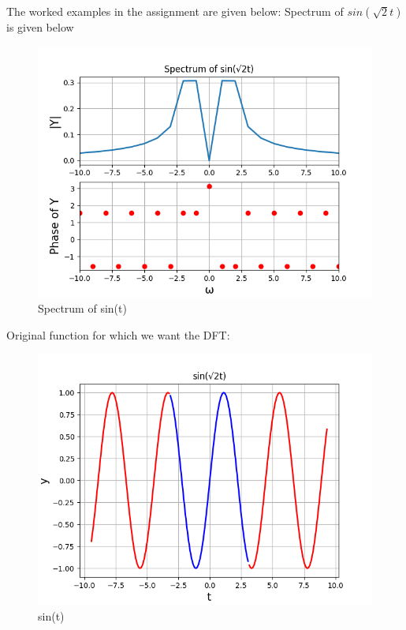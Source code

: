 \documentclass{article}
\begin{document}
The worked examples in the assignment are given below:
Spectrum of $sin(\sqrt{2}t)$ is given below\newline
\begin{figure}[h!]
\centering
\includegraphics[scale=0.6]{fig10-1.png}
\caption{Spectrum of sin(t)}
\label{fig:universe}
\end{figure}
\clearpage
Original function for which we want the DFT:
\begin{figure}[h!]
\centering
\includegraphics[scale=0.6]{fig10-2.png}
\caption{sin(t)}
\label{fig:universe}
\end{figure}
\end{document}
